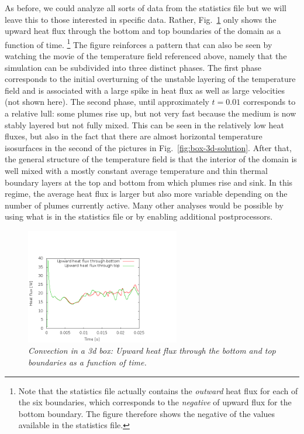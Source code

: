 \documentclass{article}
\begin{document}
As before, we could analyze all sorts of data from the statistics file but we
will leave this to those interested in specific data. Rather,
Fig.~\ref{fig:box-3d-heat-flux} only shows the upward heat flux through the
bottom and top boundaries of the domain as a function of time.%
\footnote{Note that the statistics file actually contains the \textit{outward}
heat flux for each of the six boundaries, which corresponds to the
\textit{negative} of upward flux for the bottom boundary. The figure therefore
shows the negative of the values available in the statistics file.}
The figure reinforces a pattern that can also be seen by watching the movie of
the temperature field referenced above, namely that the simulation can be
subdivided into three distinct phases. The first phase corresponds to the
initial overturning of the unstable layering of the temperature field and is
associated with a large spike in heat flux as well as large velocities (not
shown here). The second phase, until approximately $t=0.01$ corresponds to a
relative lull: some plumes rise up, but not very fast because the medium is now
stably layered but not fully mixed. This can be seen in the relatively low heat
fluxes, but also in the fact that there are almost horizontal temperature
isosurfaces in the second of the pictures in Fig.~\ref{fig:box-3d-solution}.
After that, the general structure of the temperature field is that the interior
of the domain is well mixed with a mostly constant average temperature and thin
thermal boundary layers at the top and bottom from which plumes rise and sink.
In this regime, the average heat flux is larger but also more variable depending
on the number of plumes currently active. Many other analyses would be possible
by using what is in the statistics file or by enabling additional
postprocessors.

\begin{figure}
  \centering
  \includegraphics[width=0.6\textwidth]{cookbooks/convection_box_3d/doc/heat-flux.png}
  \caption{\it Convection in a 3d box: Upward heat flux through the bottom and
  top boundaries as a function of time.}
  \label{fig:box-3d-heat-flux}
\end{figure}
\end{document}
